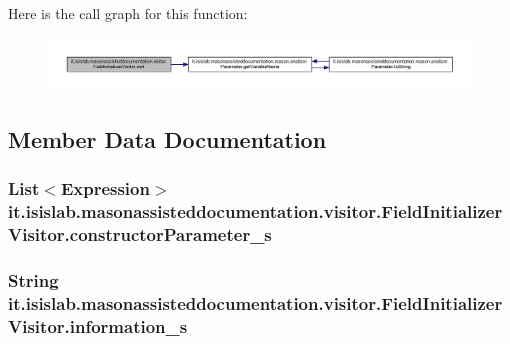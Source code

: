 Here is the call graph for this function\-:\nopagebreak
\begin{figure}[H]
\begin{center}
\leavevmode
\includegraphics[width=350pt]{classit_1_1isislab_1_1masonassisteddocumentation_1_1visitor_1_1_field_initializer_visitor_acb95069b68c5f22706789201cd5645b6_cgraph}
\end{center}
\end{figure}




\subsection{Member Data Documentation}
\hypertarget{classit_1_1isislab_1_1masonassisteddocumentation_1_1visitor_1_1_field_initializer_visitor_abeb9a316d533f971cc30bfe5af74f3ad}{
\subsubsection[{constructor\-Parameter\-\_\-s}]{\setlength{\rightskip}{0pt plus 5cm}List$<$Expression$>$ it.\-isislab.\-masonassisteddocumentation.\-visitor.\-Field\-Initializer\-Visitor.\-constructor\-Parameter\-\_\-s\hspace{0.3cm}{\ttfamily [private]}}}\label{classit_1_1isislab_1_1masonassisteddocumentation_1_1visitor_1_1_field_initializer_visitor_abeb9a316d533f971cc30bfe5af74f3ad}
\hypertarget{classit_1_1isislab_1_1masonassisteddocumentation_1_1visitor_1_1_field_initializer_visitor_aee70f4a93ab159d0895d6d37b0028144}{
\subsubsection[{information\-\_\-s}]{\setlength{\rightskip}{0pt plus 5cm}String it.\-isislab.\-masonassisteddocumentation.\-visitor.\-Field\-Initializer\-Visitor.\-information\-\_\-s\hspace{0.3cm}{\ttfamily [private]}}}\label{classit_1_1isislab_1_1masonassisteddocumentation_1_1visitor_1_1_field_initializer_visitor_aee70f4a93ab159d0895d6d37b0028144}
